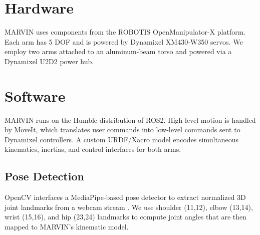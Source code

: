\documentclass[sigconf]{acmart}
\begin{document}
\section{Hardware}
MARVIN uses components from the ROBOTIS OpenManipulator-X platform. Each arm has 5 DOF and is powered by Dynamixel XM430-W350 servos. We employ two arms attached to an aluminum-beam torso and powered via a Dynamixel U2D2 power hub.

\section{Software}
MARVIN runs on the Humble distribution of ROS2. High-level motion is handled by MoveIt, which translates user commands into low-level commands sent to Dynamixel controllers. A custom URDF/Xacro model encodes simultaneous kinematics, inertias, and control interfaces for both arms.

\subsection{Pose Detection}
OpenCV interfaces a MediaPipe-based pose detector to extract normalized 3D joint landmarks from a webcam stream \cite{noauthor_mediapipe_nodate}. We use shoulder (11,12), elbow (13,14), wrist (15,16), and hip (23,24) landmarks to compute joint angles that are then mapped to MARVIN's kinematic model.
\end{document}
